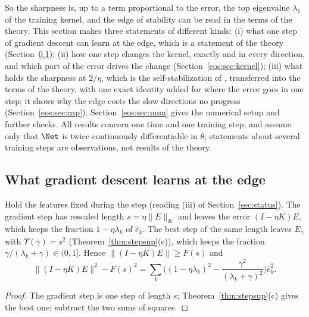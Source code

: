 So the sharpness is, up to a term proportional to the error, the top eigenvalue $\lambda_1$ of the training kernel, and the edge of stability can be read in the terms of the theory.
This section makes three statements of different kinds:
(i) what one step of gradient descent can learn at the edge, which is a statement of the theory (Section~\ref{eos:sec:edge});
(ii) how one step changes the kernel, exactly and in every direction, and which part of the error drives the change (Section~\ref{eos:sec:kernel});
(iii) what holds the sharpness at $2/\eta$, which is the self-stabilization of \cite{damian2023}, transferred into the terms of the theory, with one exact identity added for where the error goes in one step; it shows why the edge costs the slow directions no progress (Section~\ref{eos:sec:cap}).
Section~\ref{eos:sec:num} gives the numerical setup and further checks.
All results concern one time and one training step, and assume only that $\Net$ is twice continuously differentiable in $\theta$; statements about several training steps are observations, not results of the theory.

\subsection{What gradient descent learns at the edge}\label{eos:sec:edge}

\begin{proposition}\label{eos:prop:best}
Hold the features fixed during the step (reading (iii) of Section~\ref{sec:status}). The gradient step has rescaled length $s = \eta\|E\|_K$ and leaves the error $(I - \eta K)E$, which keeps the fraction $1 - \eta\lambda_k$ of $\hat e_k$. The best step of the same length leaves $E_\gamma$ with $\Upsilon(\gamma) = s^2$ (Theorem~\ref{thm:stepsup}(c)), which keeps the fraction $\gamma/(\lambda_k + \gamma)\in(0,1]$. Hence $\|(I - \eta K)E\|\ge F(s)$ and
\begin{equation}\label{eos:eq:gap}
\|(I - \eta K)E\|^2 - F(s)^2 = \sum_k\Big((1 - \eta\lambda_k)^2 - \frac{\gamma^2}{(\lambda_k + \gamma)^2}\Big)\hat e_k^2 .
\end{equation}
\end{proposition}

\begin{proof}
The gradient step is one step of length $s$; Theorem~\ref{thm:stepsup}(c) gives the best one; subtract the two sums of squares.
\end{proof}


